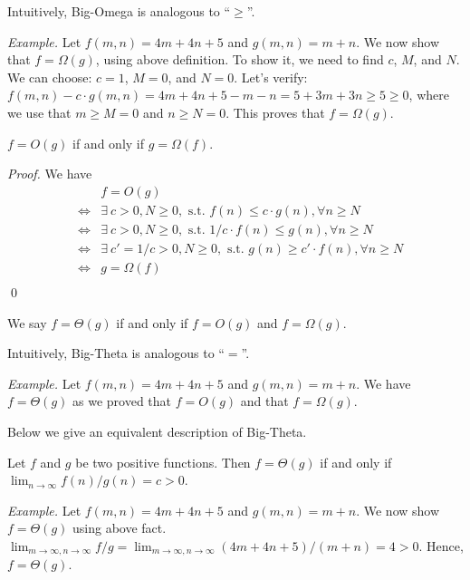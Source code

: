 Intuitively, Big-Omega is analogous to ``$\ge$''.

\emph{Example.} Let $f(m,n) = 4m + 4n + 5$ and $g(m,n) = m + n$. We now show that $f = \Omega(g)$,
using above definition. To show it, we need to find $c$, $M$, and $N$. 
We can choose: $c = 1$, $M = 0$, and $N = 0$.
Let's verify: $f(m,n) - c\cdot g(m,n) = 4m + 4n + 5 - m - n = 5 + 3m + 3n \ge 5 \ge 0$,
where we use that $m \ge M = 0$ and $n \ge N = 0$. This proves that $f = \Omega(g)$.

\begin{claim}
$f = O(g)$ if and only if $g = \Omega(f)$.
\end{claim}

\emph{Proof.} We have\\
		\begin{displaymath}
		\begin{array}{llll}
		& & f = O(g) \\
		& \Leftrightarrow & \exists\ c > 0, N \ge 0, \textrm{ s.t.\ } f(n) \le c\cdot g(n), \forall n \ge N\\
		& \Leftrightarrow & \exists\ c > 0, N \ge 0, \textrm{ s.t.\ } 1/c \cdot f(n) \le g(n), \forall n \ge N\\
		& \Leftrightarrow & \exists\ c' = 1/c > 0, N \ge 0, \textrm{ s.t.\ } g(n) \ge c'\cdot f(n), \forall n \ge N\\
		& \Leftrightarrow & g = \Omega(f) \\
		\end{array}
		\end{displaymath}
\qed

\begin{definition}
We say $f = \Theta(g)$ if and only if $f = O(g)$ and $f = \Omega(g)$.
\end{definition}

Intuitively, Big-Theta is analogous to ``$=$''.

\emph{Example.} Let $f(m,n) = 4m + 4n + 5$ and $g(m,n) = m + n$. We have $f = \Theta(g)$ as 
we proved that $f = O(g)$ and that $f = \Omega(g)$.

Below we give an equivalent description of Big-Theta.

\begin{fact}
Let $f$ and $g$ be two positive functions. Then $f = \Theta(g)$ if and only if $\lim_{n\to\infty} f(n) / g(n) = c > 0$.
\end{fact}

\emph{Example.} Let $f(m,n) = 4m + 4n + 5$ and $g(m,n) = m + n$. We now show $f = \Theta(g)$ using above fact.
$\lim_{m\to\infty, n\to\infty} f / g = \lim_{m\to\infty, n\to\infty} (4m + 4n + 5)/(m + n) = 4 > 0$.
Hence, $f = \Theta(g)$.

